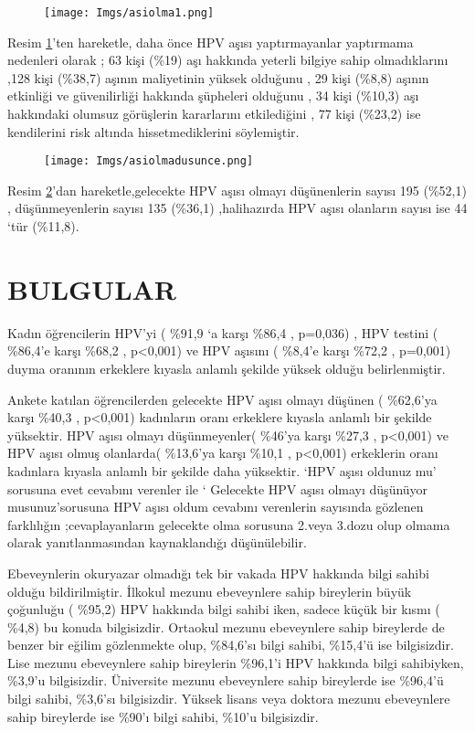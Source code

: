 \documentclass[turkish]{article}
\begin{document}
    \begin{figure}[htbp]
        \centering
        \texttt{[image: Imgs/asiolma1.png]}
        \caption{}
        \label{asiolma1}
    \end{figure}
Resim \ref{asiolma1}'ten hareketle, daha önce HPV aşısı yaptırmayanlar yaptırmama nedenleri olarak ; 63 kişi (\%19) aşı hakkında yeterli bilgiye sahip olmadıklarını ,128 kişi (\%38,7) aşının maliyetinin yüksek olduğunu , 29 kişi (\%8,8) aşının etkinliği ve güvenilirliği hakkında şüpheleri  olduğunu , 34 kişi (\%10,3) aşı hakkındaki olumsuz görüşlerin kararlarını etkilediğini , 77 kişi (\%23,2) ise kendilerini risk altında hissetmediklerini söylemiştir.

    \begin{figure}[htbp]
        \centering
        \texttt{[image: Imgs/asiolmadusunce.png]}
        \caption{}
        \label{asiolmadusunce}
    \end{figure}
Resim \ref{asiolmadusunce}'dan hareketle,gelecekte HPV aşısı olmayı düşünenlerin sayısı 195 (\%52,1) , düşünmeyenlerin sayısı 135 (\%36,1) ,halihazırda HPV aşısı olanların sayısı ise 44 ‘tür (\%11,8).
\newpage
\section{BULGULAR}
     
Kadın öğrencilerin HPV’yi  ( \%91,9 ‘a karşı  \%86,4 , p=0,036) , HPV testini  ( \%86,4’e karşı  \%68,2 , p<0,001) ve HPV aşısını ( \%8,4’e karşı  \%72,2 , p=0,001) duyma oranının erkeklere kıyasla anlamlı şekilde yüksek olduğu belirlenmiştir.

Ankete katılan öğrencilerden gelecekte HPV aşısı olmayı düşünen ( \%62,6’ya karşı  \%40,3 , p<0,001) kadınların oranı erkeklere kıyasla anlamlı bir şekilde yüksektir. HPV aşısı olmayı düşünmeyenler( \%46’ya karşı  \%27,3 , p<0,001) ve HPV aşısı olmuş olanlarda(  \%13,6’ya karşı  \%10,1 , p<0,001) erkeklerin oranı kadınlara kıyasla anlamlı bir şekilde daha yüksektir.
‘HPV aşısı oldunuz mu’ sorusuna evet cevabını verenler ile ‘ Gelecekte HPV aşısı olmayı düşünüyor musunuz’sorusuna HPV aşısı oldum cevabını verenlerin sayısında gözlenen farklılığın ;cevaplayanların gelecekte olma sorusuna 2.veya 3.dozu olup olmama olarak yanıtlanmasından kaynaklandığı düşünülebilir.

Ebeveynlerin okuryazar olmadığı tek bir vakada HPV hakkında bilgi sahibi olduğu bildirilmiştir. İlkokul mezunu ebeveynlere sahip bireylerin büyük çoğunluğu ( \%95,2) HPV hakkında bilgi sahibi iken, sadece küçük bir kısmı ( \%4,8) bu konuda bilgisizdir. Ortaokul mezunu ebeveynlere sahip bireylerde de benzer bir eğilim gözlenmekte olup,  \%84,6’sı bilgi sahibi,  \%15,4’ü ise bilgisizdir. Lise mezunu ebeveynlere sahip bireylerin  \%96,1’i HPV hakkında bilgi sahibiyken,  \%3,9’u bilgisizdir. Üniversite mezunu ebeveynlere sahip bireylerde ise  \%96,4’ü bilgi sahibi,  \%3,6’sı bilgisizdir. Yüksek lisans veya doktora mezunu ebeveynlere sahip bireylerde ise  \%90’ı bilgi sahibi,  \%10’u bilgisizdir.
\end{document}
